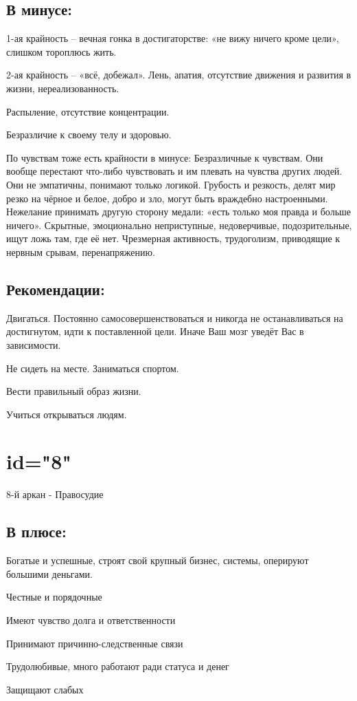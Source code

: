 \subsection{В минусе:}
\item 1-ая крайность – вечная гонка в достигаторстве: «не вижу ничего кроме цели», слишком тороплюсь жить.
\item 2-ая крайность – «всё, добежал». Лень, апатия, отсутствие движения и развития в жизни, нереализованность.
\item Распыление, отсутствие концентрации.
\item Безразличие к своему телу и здоровью.
\item По чувствам тоже есть крайности в минусе:
Безразличные к чувствам. Они вообще перестают что-либо чувствовать и им плевать на чувства других людей. Они не эмпатичны, понимают только логикой.
Грубость и резкость, делят мир резко на чёрное и белое, добро и зло, могут быть враждебно настроенными. Нежелание принимать другую сторону медали: «есть только моя правда и больше ничего».
Скрытные, эмоционально неприступные, недоверчивые, подозрительные, ищут ложь там, где её нет.
 Чрезмерная активность, трудоголизм, приводящие к нервным срывам, перенапряжению.
\endsubsection

\subsection{Рекомендации:}
\item Двигаться. Постоянно самосовершенствоваться и никогда не останавливаться на достигнутом, идти к поставленной цели. Иначе Ваш мозг уведёт Вас в зависимости.
\item Не сидеть на месте. Заниматься спортом.
\item Вести правильный образ жизни.
\item Учиться открываться людям.
\endsubsection

\endsection

\section{id="8"}{8-й аркан - Правосудие}

\subsection{В плюсе:}
\item Богатые и успешные, строят свой крупный бизнес, системы, оперируют большими деньгами.
\item Честные и порядочные
\item Имеют чувство долга и ответственности
\item Принимают причинно-следственные связи
\item Трудолюбивые, много работают ради статуса и денег
\item Защищают слабых
\endsubsection

